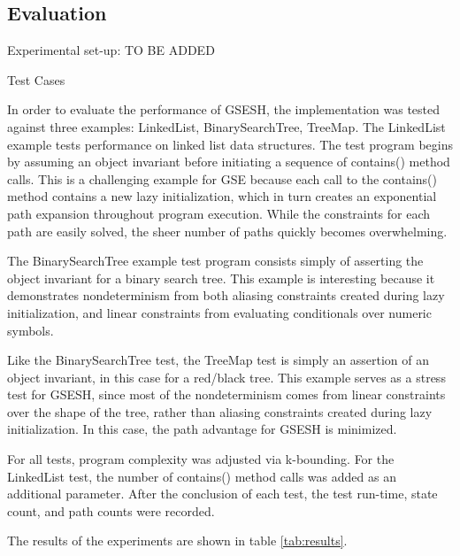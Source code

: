 \subsection{Evaluation} 
Experimental set-up: TO BE ADDED

Test Cases

In order to evaluate the performance of GSESH, the implementation was tested against three examples: LinkedList, BinarySearchTree, TreeMap.
The LinkedList example tests performance on linked list data structures. The test program begins by assuming an object invariant before initiating a sequence of contains() method calls. This is a challenging example for GSE because each call to the contains() method contains a new lazy initialization, which in turn creates an exponential path expansion throughout program execution. While the constraints for each path are easily solved, the sheer number of paths quickly becomes overwhelming.

The BinarySearchTree example test program consists simply of asserting the object invariant for a binary search tree. This example is interesting because it demonstrates nondeterminism from both aliasing constraints created during lazy initialization, and linear constraints from evaluating conditionals over numeric symbols. 

Like the BinarySearchTree test, the TreeMap test is simply an assertion of an object invariant, in this case for a red/black tree. This example serves as a stress test for GSESH, since most of the nondeterminism comes from linear constraints over the shape of the tree, rather than aliasing constraints created during lazy initialization. In this case, the path advantage for GSESH is minimized.

For all tests, program complexity was adjusted via k-bounding. For the LinkedList test, the number of contains() method calls was added as an additional parameter. After the conclusion of each test, the test run-time, state count, and path counts were recorded. 

The results of the experiments are shown in table \ref{tab:results}.

